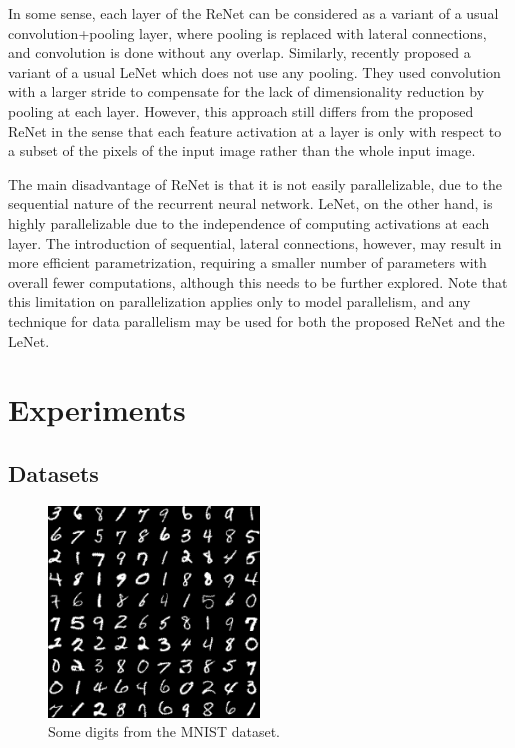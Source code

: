 In some sense, each layer of the ReNet can be considered as a variant of a
usual convolution+pooling layer, where pooling is replaced with lateral
connections, and convolution is done without any overlap. Similarly,
\citet{Springenberg2014} recently proposed a variant of a usual LeNet which
does not use any pooling.  They used convolution with a larger stride to
compensate for the lack of dimensionality reduction by pooling at each layer.
However, this approach still differs from the proposed ReNet in the sense that
each feature activation at a layer is only with respect to a subset of the
pixels of the input image rather than the whole input image.

The main disadvantage of ReNet is that it is not easily parallelizable, due to
the sequential nature of the recurrent neural network. LeNet, on the
other hand, is highly parallelizable due to the independence of computing
activations at each layer. The introduction of sequential, lateral connections,
however, may result in more efficient parametrization, requiring a smaller
number of parameters with overall fewer computations, although this needs to be
further explored. Note that this limitation on parallelization applies only to
model parallelism, and any technique for data parallelism may be used for both
the proposed ReNet and the LeNet.


\section{Experiments}\label{sec:renet_experiments}

\subsection{Datasets}

\begin{figure}[!t]
    \centering
    \includegraphics[width=0.5\textwidth]{img/renet/mnist_digits.png}
    \caption{Some digits from the MNIST dataset.}
    \label{fig:mnist_digits}
\end{figure}


